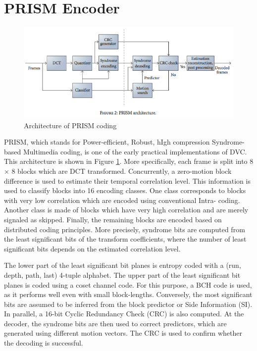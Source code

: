 \documentclass[letterpaper,12pt,titlepage,oneside,final]{report}
\begin{document}
    \section{PRISM Encoder}
        \begin{figure}[!h]
            \centering
            \includegraphics[width=\textwidth]{prism}
            \caption{Architecture of PRISM coding\cite{Dufaux2009}}
            \label{prism}
        \end{figure}
        PRISM, which stands for Power-efficient, Robust, hIgh compression Syndrome-based Multimedia coding, is one of the early practical implementations of DVC. This architecture is shown in Figure \ref{prism}. More specifically, each frame is split into 8 × 8 blocks which are DCT transformed. Concurrently, a zero-motion block difference is used to estimate their temporal correlation level. This information is used to classify blocks into 16 encoding classes. One class corresponds to blocks with very low correlation which are encoded using conventional Intra- coding. Another class is made of blocks which have very high correlation and are merely signaled as skipped. Finally, the remaining blocks are encoded based on distributed coding principles. More precisely, syndrome bits are computed from the least significant bits of the transform coefficients, where the number of least significant bits depends on the estimated correlation level. 

        The lower part of the least significant bit planes is entropy coded with a (run, depth, path, last) 4-tuple alphabet. The upper part of the least significant bit planes is coded using a coset channel code. For this purpose, a BCH code is used, as it performs well even with small block-lengths. Conversely, the most significant bits are assumed to be inferred from the block predictor or Side Information (SI). In parallel, a 16-bit Cyclic Redundancy Check (CRC) is also computed. At the decoder, the syndrome bits are then used to correct predictors, which are generated using different motion vectors. The CRC is used to confirm whether the decoding is successful.
\end{document}
